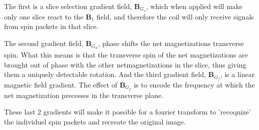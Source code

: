 The first is a slice selection gradient field, $\mathbf{B}_{G_s}$,
which when applied will make only one slice react to the
$\mathbf{B}_1$ field, and therefore the coil will only receive signals
from spin packets in that slice.

The second gradient field, $\mathbf{B}_{G_\phi}$, phase shifts the net
magnetizations transverse spin. What this means is that the transverse
spin of the net magnetizations are brought out of phase with the other
netmagnetizations in the slice, thus giving them a uniquely detectable
rotation. And the third gradient field, $\mathbf{B}_{G_f}$, is a
linear magnetic field gradient. The effect of $\mathbf{B}_{G_f}$ is to
encode the frequency at which the net magnetization precesses in the
transverse plane.

These last 2 gradients will make it possible for a fourier transform
to 'recoqnize' the individuel spin packets and recreate the original
image.
